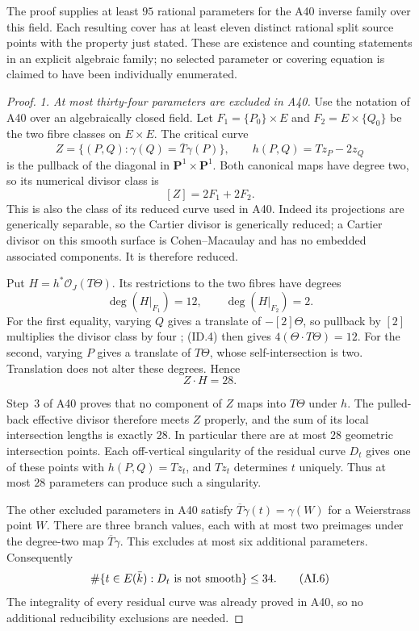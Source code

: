\documentclass[11pt,a4paper]{article}
\begin{document}
The proof supplies at least $95$ rational parameters for
the A40 inverse family over this field. Each resulting
cover has at least eleven distinct rational split source
points with the property just stated. These are existence
and counting statements in an explicit algebraic family;
no selected parameter or covering equation is claimed to
have been individually enumerated.

\begin{proof}
\emph{1. At most thirty-four parameters are excluded in A40.}
Use the notation of A40 over an algebraically closed field.
Let $F_1=\{P_0\}\times E$ and $F_2=E\times\{Q_0\}$ be
the two fibre classes on $E\times E$. The critical curve
\[
 Z=\{(P,Q):\gamma(Q)=\overline T\gamma(P)\},
         \qquad h(P,Q)=Tz_P-2z_Q
 \tag{AI.2}
\]
is the pullback of the diagonal in $\mathbf P^1\times\mathbf P^1$.
Both canonical maps have degree two, so its numerical
divisor class is
\[
                             [Z]=2F_1+2F_2.
 \tag{AI.3}
\]
This is also the class of its reduced curve used in A40.
Indeed its projections are generically separable, so the
Cartier divisor is generically reduced; a Cartier divisor
on this smooth surface is Cohen--Macaulay and has no
embedded associated components. It is therefore reduced.

Put $H=h^*\mathcal O_J(T\Theta)$. Its restrictions to the
two fibres have degrees
\[
                         \deg(H|_{F_1})=12,
                \qquad \deg(H|_{F_2})=2.
 \tag{AI.4}
\]
For the first equality, varying $Q$ gives a translate of
$-[2]\Theta$, so pullback by $[2]$ multiplies the divisor
class by four \cite[Corollary~6.6 and Remark~12.13,
pp.~9 and~24]{MilneAV}; (ID.4) then gives
$4(\Theta\cdot T\Theta)=12$.
For the second, varying $P$ gives a translate of $T\Theta$,
whose self-intersection is two. Translation does not alter
these degrees. Hence
\[
                             Z\cdot H=28.
 \tag{AI.5}
\]

Step~3 of A40 proves that no component of $Z$ maps into
$T\Theta$ under $h$. The pulled-back effective divisor
therefore meets $Z$ properly, and the sum of its local
intersection lengths is exactly $28$. In particular there
are at most $28$ geometric intersection points. Each
off-vertical singularity of the residual curve $D_t$ gives
one of these points with $h(P,Q)=Tz_t$, and $Tz_t$
determines $t$ uniquely. Thus at most $28$ parameters can
produce such a singularity.

The other excluded parameters in A40 satisfy
$\overline T\gamma(t)=\gamma(W)$ for a Weierstrass point
$W$. There are three branch values, each with at most two
preimages under the degree-two map $\overline T\gamma$.
This excludes at most six additional parameters. Consequently
\[
        \#\{t\in E(\bar k):D_t\hbox{ is not smooth}\}\le34.
 \tag{AI.6}
\]
The integrality of every residual curve was already proved
in A40, so no additional reducibility exclusions are needed.


\end{proof}
\end{document}
